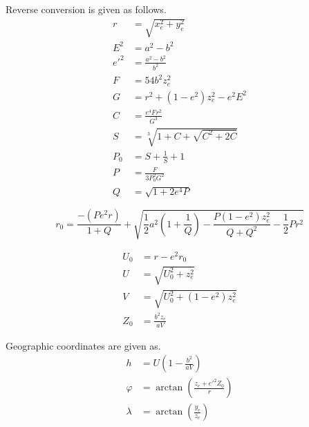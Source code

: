 Reverse conversion is given as follows. \cite{Zhu1994}
\begin{align}
  r    &= \sqrt{x_e^2+y_e^2} \\
  E^2  &= a^2 - b^2 \\
  e'^2 &= \frac{a^2-b^2}{b^2} \\
  F    &= 54 b^2 z_e^2 \\
  G    &= r^2 + \left( 1 - e^2 \right) z_e^2 - e^2 E^2 \\
  C    &= \frac{e^4 F r^2}{G^3} \\
  S    &= \sqrt[3]{1+C+\sqrt{C^2+2C}} \\
  P_0  &= S + \frac{1}{S} + 1 \\
  P    &= \frac{F}{3P_0^2 G^2} \\
  Q    &= \sqrt{1 + 2e^4 P}
\end{align}

\begin{equation}
  r_0  =
  \frac{ -\left(Pe^2 r \right) }{1+Q}
  + \sqrt{
    \frac{1}{2}a^2 \left(1+\frac{1}{Q}\right)
    -
    \frac{P\left(1-e^2 \right)z_e^2}{Q+Q^2}
    -
    \frac{1}{2}Pr^2
  }
\end{equation}


\begin{align}
  U_0  &= r - e^2 r_0 \\
  U    &= \sqrt{ U_0^2 + z_e^2 } \\
  V    &= \sqrt{ U_0^2 + \left( 1 - e^2 \right) z_e^2 } \\
  Z_0  &= \frac{b^2 z_e}{aV}
\end{align}

Geographic coordinates are given as.
\begin{align}
  h    &= U \left( 1 - \frac{b^2}{aV} \right) \\
  \varphi &= \arctan \left( \frac{z_e + e'^2 Z_0}{r} \right) \\
  \lambda &= \arctan \left( \frac{y_e}{z_e} \right)
\end{align}
